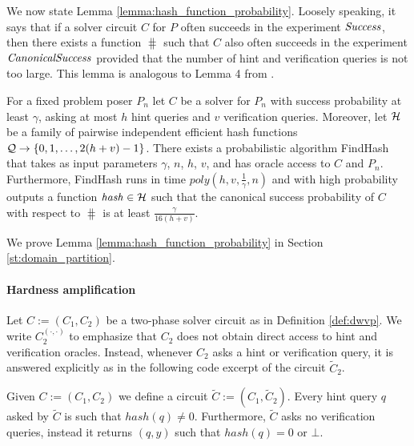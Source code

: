 We now state Lemma \ref{lemma:hash_function_probability}. Loosely speaking, it says that if a solver circuit $C$ for $P$
often succeeds in the experiment $\operatorname{\mathit{Success}}$, then there exists a function $\hash$ such that $C$ also
often succeeds in the experiment $\operatorname{\mathit{CanonicalSuccess}}$ provided that the number of hint and verification queries is not too large.
This lemma is analogous to Lemma 4 from \cite{dodis2009security}.

\begin{lemma}
\label{lemma:hash_function_probability}
For a fixed problem poser $P_n$ let $C$ be a solver for $P_n$ with success probability at least $\gamma$,
asking at most $h$ hint queries and $v$ verification queries.
Moreover, let $\mathcal{H}$ be a family of pairwise independent efficient hash functions $\mathcal{Q} \rightarrow \{0,1, \dots,2(h+v)-1\}$.
There exists a probabilistic algorithm FindHash that takes as input parameters $\gamma$, $n$, $h$, $v$, and has oracle access to $C$ and $P_n$.
Furthermore, FindHash runs in time $poly(h,v,\frac{1}{\gamma},n)$ and with high probability outputs a function $\operatorname{\mathit{hash}} \in \mathcal{H}$
such that the canonical success probability of $C$ with respect to $\hash$ is at least $\frac{\gamma}{16(h+v)}$.
\end{lemma}
We prove Lemma \ref{lemma:hash_function_probability} in Section \ref{st:domain_partition}.
%
\paragraph{Hardness amplification}%
Let $C := (C_1, C_2)$ be a two-phase solver circuit as in Definition \ref{def:dwvp}.
We write $C_2^{(\cdot, \cdot)}$ to emphasize that $C_2$ does not obtain direct access to hint and verification oracles.
Instead, whenever $C_2$ asks a hint or verification query, it is answered explicitly
as in the following code excerpt of the circuit $\widetilde{C}_2$.

Given $C := (C_1, C_2)$ we define a circuit $\widetilde{C} := (C_1, \widetilde{C}_2)$.
Every hint query $q$ asked by $\widetilde{C}$ is such that $hash(q) \neq 0$. Furthermore, $\widetilde{C}$ asks no verification queries,
instead it returns $(q,y)$ such that $hash(q) = 0$ or $\bot$.


